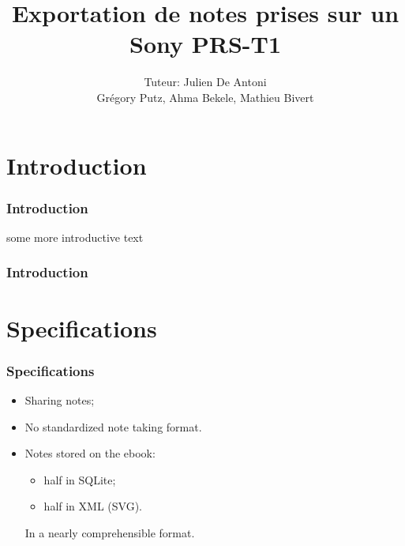 \documentclass[t,12pt]{beamer}
\title{Exportation de notes prises sur un Sony PRS-T1}
\author{Tuteur: Julien De Antoni\\Grégory Putz, Ahma Bekele, Mathieu Bivert}
\date{\oldstylenums{Juin 2012}}
\begin{document}
\frame{\titlepage}

\section{Introduction}

\begin{frame}
  \frametitle{Introduction}
  some more introductive text
\end{frame}

\begin{frame}
  \frametitle{Introduction}
  \centering
  \tableofcontents
\end{frame}



\section{Specifications}
\begin{frame}
  \frametitle{Specifications}
  \begin{itemize}
  \pause \item Sharing notes;
  \pause \item No standardized note taking format.
  \pause \item Notes stored  on the ebook:
    \begin{itemize}
      \item half in SQLite;
      \item half in XML (SVG).
    \end{itemize}
  \pause In a nearly comprehensible format.
  \end{itemize}
\end{frame}
\end{document}
